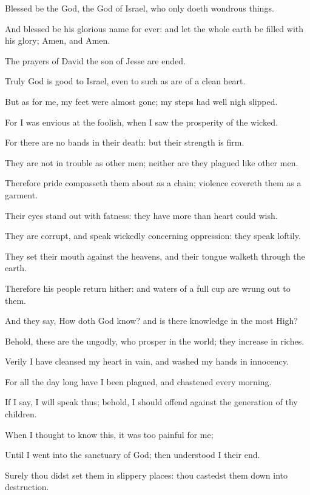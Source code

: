 \Verse Blessed be the \LORD God, the God of Israel, who only doeth wondrous things.

\Verse And blessed be his glorious name for ever: and let the whole earth be filled with his glory; Amen, and Amen.

\Verse The prayers of David the son of Jesse are ended.




\Chapter
\Verse Truly God is good to Israel, even to such as are of a clean heart.

\Verse But as for me, my feet were almost gone; my steps had well nigh slipped.

\Verse For I was envious at the foolish, when I saw the prosperity of the wicked.

\Verse For there are no bands in their death: but their strength is firm.

\Verse They are not in trouble as other men; neither are they plagued like other men.

\Verse Therefore pride compasseth them about as a chain; violence covereth them as a garment.

\Verse Their eyes stand out with fatness: they have more than heart could wish.

\Verse They are corrupt, and speak wickedly concerning oppression: they speak loftily.

\Verse They set their mouth against the heavens, and their tongue walketh through the earth.

\Verse Therefore his people return hither: and waters of a full cup are wrung out to them.

\Verse And they say, How doth God know? and is there knowledge in the most High?

\Verse Behold, these are the ungodly, who prosper in the world; they increase in riches.

\Verse Verily I have cleansed my heart in vain, and washed my hands in innocency.

\Verse For all the day long have I been plagued, and chastened every morning.

\Verse If I say, I will speak thus; behold, I should offend against the generation of thy children.

\Verse When I thought to know this, it was too painful for me;

\Verse Until I went into the sanctuary of God; then understood I their end.

\Verse Surely thou didst set them in slippery places: thou castedst them down into destruction.

